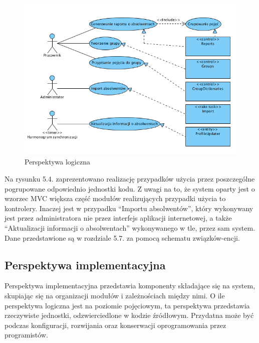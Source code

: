\begin{figure}[H] 
\centering\includegraphics[width=15cm]{figures/image5}
\caption{Perspektywa logiczna}\label{rys:use-case-diagram}
\end{figure}

Na rysunku 5.4. zaprezentowano realizację przypadków użycia przez poszczególne pogrupowane odpowiednio jednostki kodu. Z uwagi na to, że system oparty jest o wzorzec MVC większa część modułów realizujących przypadki użycia to kontrolery. Inaczej jest w przypadku “Importu absolwentów”, który wykonywany jest przez administratora nie przez interfejs aplikacji internetowej, a także “Aktualizacji informacji o absolwentach” wykonywanego w tle, przez sam system.
Dane przedstawione są w rozdziale 5.7. za pomocą schematu związków-encji.

\subsection{Perspektywa implementacyjna}

Perspektywa implementacyjna przedstawia komponenty składające się na system, skupiając się na organizacji modułów i zależnościach między nimi. O ile perspektywa logiczna jest na poziomie pojęciowym, ta perspektywa przedstawia rzeczywiste jednostki, odzwierciedlone w kodzie źródłowym. Przydatna może być podczas konfiguracji, rozwijania oraz konserwacji oprogramowania przez programistów.

